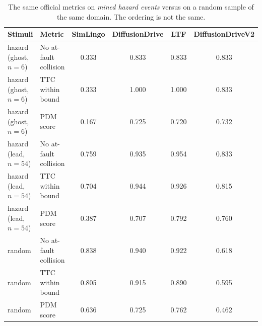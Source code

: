 \begin{table}[!tb]
\centering
\footnotesize
\setlength{\tabcolsep}{4pt}
\caption{The same official metrics on \emph{mined hazard events} versus on a random sample of the same domain. The ordering is not the same.}
\label{tab:hazard}
\begin{tabular}{llcccc}
\toprule
Stimuli & Metric & SimLingo & DiffusionDrive & LTF & DiffusionDriveV2\\
\midrule
hazard (ghost, $n{=}6$) & No at-fault collision & 0.333 & 0.833 & 0.833 & 0.833\\
hazard (ghost, $n{=}6$) & TTC within bound & 0.333 & 1.000 & 1.000 & 0.833\\
hazard (ghost, $n{=}6$) & PDM score & 0.167 & 0.725 & 0.720 & 0.732\\
\midrule
hazard (lead, $n{=}54$) & No at-fault collision & 0.759 & 0.935 & 0.954 & 0.833\\
hazard (lead, $n{=}54$) & TTC within bound & 0.704 & 0.944 & 0.926 & 0.815\\
hazard (lead, $n{=}54$) & PDM score & 0.387 & 0.707 & 0.792 & 0.760\\
\midrule
random & No at-fault collision & 0.838 & 0.940 & 0.922 & 0.618\\
random & TTC within bound & 0.805 & 0.915 & 0.890 & 0.595\\
random & PDM score & 0.636 & 0.725 & 0.762 & 0.462\\
\bottomrule
\end{tabular}
\end{table}
